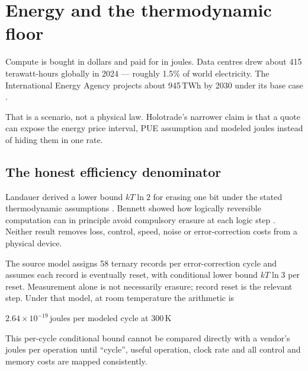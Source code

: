 \documentclass[11pt,letterpaper]{article}
\newcommand{\tagbox}[3]{\tikz[baseline=(X.base)]{\node[inner xsep=3.5pt,inner ysep=1.4pt,rounded corners=1.6pt,fill=#1,text=#2,font=\bfseries\sffamily\tiny] (X) {#3};}}
\newcommand{\MODELLED}{\tagbox{amberlite}{amber!55!black}{MODELLED}}
\newcommand{\PUBLISHED}{\tagbox{greylite}{grey}{PUBLISHED}}
\newcommand{\bignum}[2]{{\color{navy}\bfseries\Large #1}\,{\footnotesize\color{grey}#2}}
\begin{document}
\newpage

\section{Energy and the thermodynamic floor}

\begin{plainbox}[]
Compute is bought in dollars and paid for in joules. Data centres drew about
415 terawatt-hours globally in 2024 --- roughly 1.5\% of world electricity.
The International Energy Agency projects about 945\,TWh by 2030 under its base
case \cite{iea2025energyai}. \PUBLISHED
\end{plainbox}

That is a scenario, not a physical law. Holotrade's narrower claim is that a
quote can expose the energy price interval, PUE assumption and modeled joules
instead of hiding them in one rate.

\subsection{The honest efficiency denominator}

\begin{plainbox}
Landauer derived a lower bound $kT\ln 2$ for erasing one bit under the stated
thermodynamic assumptions \cite{landauer1961}. Bennett showed how logically
reversible computation can in principle avoid compulsory erasure at each logic
step \cite{bennett1973}. Neither result removes loss, control, speed, noise or
error-correction costs from a physical device.
\end{plainbox}

The source model assigns 58 ternary records per error-correction cycle and
assumes each record is eventually reset, with conditional lower bound
$kT\ln 3$ per reset. Measurement alone is not necessarily erasure; record reset
is the relevant step. Under that model, at room temperature the arithmetic is

\begin{center}
\bignum{$2.64\times 10^{-19}$}{joules per modeled cycle at 300\,K} \hfill \MODELLED
\end{center}

This per-cycle conditional bound cannot be compared directly with a vendor's
joules per operation until ``cycle'', useful operation, clock rate and all
control and memory costs are mapped consistently.
\end{document}
